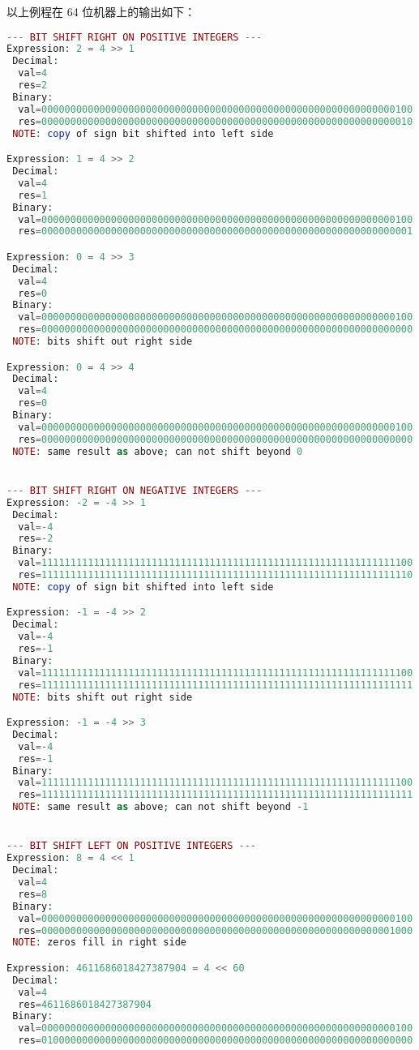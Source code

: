 以上例程在 64 位机器上的输出如下：

\begin{lstlisting}[language=PHP]
--- BIT SHIFT RIGHT ON POSITIVE INTEGERS ---
Expression: 2 = 4 >> 1
 Decimal:
  val=4
  res=2
 Binary:
  val=0000000000000000000000000000000000000000000000000000000000000100
  res=0000000000000000000000000000000000000000000000000000000000000010
 NOTE: copy of sign bit shifted into left side

Expression: 1 = 4 >> 2
 Decimal:
  val=4
  res=1
 Binary:
  val=0000000000000000000000000000000000000000000000000000000000000100
  res=0000000000000000000000000000000000000000000000000000000000000001

Expression: 0 = 4 >> 3
 Decimal:
  val=4
  res=0
 Binary:
  val=0000000000000000000000000000000000000000000000000000000000000100
  res=0000000000000000000000000000000000000000000000000000000000000000
 NOTE: bits shift out right side

Expression: 0 = 4 >> 4
 Decimal:
  val=4
  res=0
 Binary:
  val=0000000000000000000000000000000000000000000000000000000000000100
  res=0000000000000000000000000000000000000000000000000000000000000000
 NOTE: same result as above; can not shift beyond 0


--- BIT SHIFT RIGHT ON NEGATIVE INTEGERS ---
Expression: -2 = -4 >> 1
 Decimal:
  val=-4
  res=-2
 Binary:
  val=1111111111111111111111111111111111111111111111111111111111111100
  res=1111111111111111111111111111111111111111111111111111111111111110
 NOTE: copy of sign bit shifted into left side

Expression: -1 = -4 >> 2
 Decimal:
  val=-4
  res=-1
 Binary:
  val=1111111111111111111111111111111111111111111111111111111111111100
  res=1111111111111111111111111111111111111111111111111111111111111111
 NOTE: bits shift out right side

Expression: -1 = -4 >> 3
 Decimal:
  val=-4
  res=-1
 Binary:
  val=1111111111111111111111111111111111111111111111111111111111111100
  res=1111111111111111111111111111111111111111111111111111111111111111
 NOTE: same result as above; can not shift beyond -1


--- BIT SHIFT LEFT ON POSITIVE INTEGERS ---
Expression: 8 = 4 << 1
 Decimal:
  val=4
  res=8
 Binary:
  val=0000000000000000000000000000000000000000000000000000000000000100
  res=0000000000000000000000000000000000000000000000000000000000001000
 NOTE: zeros fill in right side

Expression: 4611686018427387904 = 4 << 60
 Decimal:
  val=4
  res=4611686018427387904
 Binary:
  val=0000000000000000000000000000000000000000000000000000000000000100
  res=0100000000000000000000000000000000000000000000000000000000000000


\end{lstlisting}
